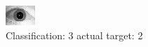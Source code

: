 \begin{figure}[h!]
\begin{center}
\includegraphics[width=0.60\columnwidth]{figures/ID1743_class_3_target_2.png}
\end{center}
\caption{ Classification: 3 actual target: 2}
\label{fig:ID1743_class_3_target_2}
\end{figure}
